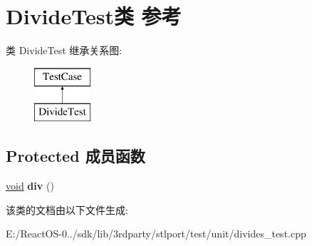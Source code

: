 \hypertarget{class_divide_test}{}\section{Divide\+Test类 参考}
\label{class_divide_test}
类 Divide\+Test 继承关系图\+:\begin{figure}[H]
\begin{center}
\leavevmode
\includegraphics[height=2.000000cm]{class_divide_test}
\end{center}
\end{figure}
\subsection*{Protected 成员函数}
\begin{DoxyCompactItemize}
\item 
\mbox{\label{class_divide_test_ad55939f1c5d00e5861019417643d082a}} 
\hyperlink{interfacevoid}{void} {\bfseries div} ()
\end{DoxyCompactItemize}


该类的文档由以下文件生成\+:\begin{DoxyCompactItemize}
\item 
E\+:/\+React\+O\+S-\/0../sdk/lib/3rdparty/stlport/test/unit/divides\+\_\+test.\+cpp\end{DoxyCompactItemize}
